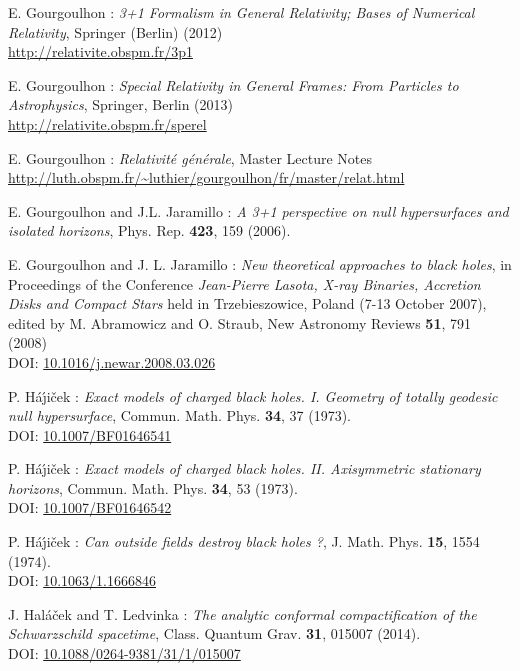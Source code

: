 \begin{thebibliography}{123}
E. Gourgoulhon : {\em 3+1 Formalism in General Relativity; Bases of Numerical Relativity},
Springer (Berlin) (2012)\\
\url{http://relativite.obspm.fr/3p1}

E. Gourgoulhon : {\em Special Relativity in General Frames: From Particles to Astrophysics},
Springer, Berlin (2013) \\
\url{http://relativite.obspm.fr/sperel}

E. Gourgoulhon : {\em Relativit\'e g\'en\'erale},
Master Lecture Notes\\
\url{http://luth.obspm.fr/~luthier/gourgoulhon/fr/master/relat.html}

E. Gourgoulhon and J.L. Jaramillo : {\em A 3+1 perspective on null hypersurfaces and isolated horizons},
Phys. Rep. {\bf 423}, 159 (2006).

E. Gourgoulhon and J. L. Jaramillo : {\em New theoretical approaches to black holes},
in Proceedings of the Conference {\em Jean-Pierre Lasota, X-ray Binaries, Accretion Disks and Compact Stars} held in Trzebieszowice, Poland (7-13 October 2007), edited by M. Abramowicz and O. Straub, New Astronomy Reviews {\bf 51}, 791 (2008) \\
DOI: \href{http://dx.doi.org/doi:10.1016/j.newar.2008.03.026}{10.1016/j.newar.2008.03.026}

P. H\'a\'\j i\v{c}ek : {\em Exact models of charged black holes. I. Geometry
of totally geodesic null hypersurface},
Commun. Math. Phys. {\bf 34}, 37 (1973). \\
DOI: \href{http://dx.doi.org/10.1007/BF01646541}{10.1007/BF01646541}

P. H\'a\'\j i\v{c}ek : {\em Exact models of charged black holes.
II. Axisymmetric stationary horizons},
Commun. Math. Phys. {\bf 34}, 53 (1973). \\
DOI: \href{http://dx.doi.org/10.1007/BF01646542}{10.1007/BF01646542}

P. H\'a\'\j i\v{c}ek : {\em Can outside fields destroy black holes ?},
J. Math. Phys. {\bf 15}, 1554 (1974). \\
DOI: \href{http://dx.doi.org/10.1063/1.1666846}{10.1063/1.1666846}

J. Hal\'a\v{c}ek and T. Ledvinka :
{\em The analytic conformal compactification of the Schwarzschild spacetime},
Class. Quantum Grav. {\bf 31}, 015007 (2014).\\
DOI: \href{http://dx.doi.org/10.1088/0264-9381/31/1/015007}{10.1088/0264-9381/31/1/015007}


\end{thebibliography}
